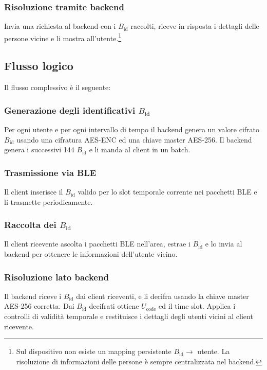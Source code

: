 \documentclass[a4paper,11pt]{article}
\begin{document}
\subsubsection{Risoluzione tramite backend}
Invia una richiesta al backend con i \(B_{\text{id}}\) raccolti, riceve in risposta i dettagli delle persone vicine e li mostra all'utente.\footnote{Sul dispositivo non esiste un mapping persistente \(B_{\text{id}} \rightarrow\) utente. La risoluzione di informazioni delle persone è sempre centralizzata nel backend.}

\subsection{Flusso logico}
Il flusso complessivo è il seguente:

\subsubsection{Generazione degli identificativi \(B_{\text{id}}\)}
Per ogni utente e per ogni intervallo di tempo il backend genera un valore cifrato \(B_{\text{id}}\) usando una cifratura AES-ENC ed una
chiave master AES-256. Il backend genera i successivi 144 \(B_{\text{id}}\) e li manda al client in un batch.

\subsubsection{Trasmissione via BLE}
Il client inserisce il \(B_{\text{id}}\) valido per lo slot temporale corrente nei pacchetti BLE e li trasmette periodicamente.

\subsubsection{Raccolta dei \(B_{\text{id}}\)}
Il client ricevente ascolta i pacchetti BLE nell'area, estrae i \(B_{\text{id}}\) e lo invia al backend per ottenere le informazioni dell'utente vicino.

\subsubsection{Risoluzione lato backend}
Il backend riceve i \(B_{\text{id}}\) dai client riceventi, e li decifra usando la chiave master AES-256 corretta. Dai \(B_{\text{id}}\) decifrati ottiene \(U_{\text{code}}\) ed il time slot.
Applica i controlli di validità temporale e restituisce i dettagli degli utenti vicini al client ricevente.
\end{document}
